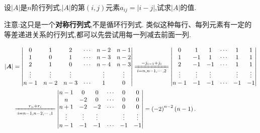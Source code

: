 \documentclass[../../main.tex]{subfiles}%
\begin{document}
\begin{example}
设\(\vert A\vert\)是\(n\)阶行列式,\(\vert A\vert\)的第\((i,j)\)元素\(a_{ij}=\vert i - j\vert\),试求\(\vert A\vert\)的值.
\end{example}
\begin{note}
注意:这只是一个\textbf{对称行列式},不是循环行列式.
类似这种每行、每列元素有一定的等差递进关系的行列式,都可以先尝试用每一列减去前面一列.
\end{note}
\begin{solution}

\begin{align*}
\left| \boldsymbol{A} \right|&=\left| \begin{matrix}
0&		1&		2&		\cdots&		n-2&		n-1\\
1&		0&		1&		\cdots&		n-3&		n-2\\
2&		1&		0&		\cdots&		n-4&		n-3\\
\vdots&		\vdots&		\vdots&		&		\vdots&		\vdots\\
n-1&		n-2&		n-3&		\cdots&		1&		0\\
\end{matrix} \right|\xlongequal[i=n,n-1,\cdots ,2]{-j_{i-1}+j_i}\left| \begin{matrix}
0&		1&		1&		\cdots&		1&		1\\
1&		-1&		1&		\cdots&		1&		1\\
2&		-1&		-1&		\cdots&		1&		1\\
\vdots&		\vdots&		\vdots&		&		\vdots&		\vdots\\
n-1&		-1&		-1&		\cdots&		-1&		-1\\
\end{matrix} \right|
\\
&\xlongequal[i=n-1,n-2,\cdots ,1]{r_n+r_i}\left| \begin{matrix}
n-1&		0&		0&		\cdots&		0&		0\\
n&		-2&		0&		\cdots&		0&		0\\
n+1&		-2&		-2&		\cdots&		0&		0\\
\vdots&		\vdots&		\vdots&		&		\vdots&		\vdots\\
n-1&		-1&		-1&		\cdots&		-1&		-1\\
\end{matrix} \right|=\left( -2 \right) ^{n-2}\left( n-1 \right) .
\end{align*}

\end{solution}
\end{document}

